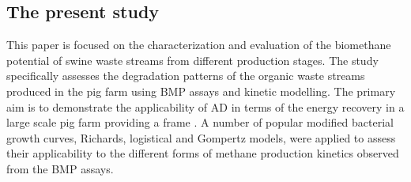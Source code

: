 \subsection{The present study}
This paper is focused on the characterization and evaluation of the biomethane potential of swine waste streams from different production stages. The study specifically assesses the degradation patterns of the organic waste streams produced in the pig farm using BMP assays and kinetic modelling. The primary aim is to demonstrate the applicability of AD in terms of the energy recovery in a large scale pig farm providing a frame  . A number of popular modified bacterial growth curves, Richards, logistical and Gompertz models, were applied to assess their applicability to the different forms of methane production kinetics observed from the BMP assays.